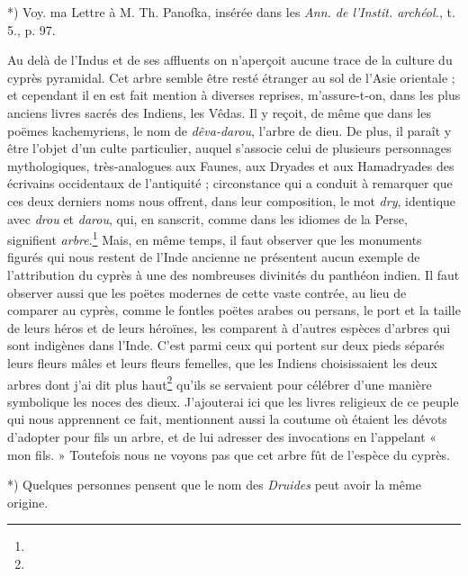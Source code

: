 \documentclass[a4paper, 11pt, oneside, polutonikogreek, french]{article}
\begin{document}
*) Voy. ma Lettre à M. Th. Panofka, insérée dans les \emph{Ann. de l'Instit. archéol.}, t. 5., p. 97.

Au delà de l'Indus et de ses affluents on n'aperçoit aucune trace de la culture du cyprès pyramidal. Cet arbre semble être resté étranger au sol de l'Asie orientale ; et cependant il en est fait mention à diverses reprises, m'assure-t-on, dans les plus anciens livres sacrés des Indiens, les Vêdas. Il y reçoit, de même que dans les poëmes kachemyriens, le nom de \emph{dêva-darou}, l'arbre de dieu. De plus, il paraît y être l'objet d'un culte particulier, auquel s'associe celui de plusieurs personnages mythologiques, très-analogues aux Faunes, aux Dryades et aux Hamadryades des écrivains occidentaux de l'antiquité ; circonstance qui a conduit à remarquer que ces deux derniers noms nous offrent, dans leur composition, le mot \emph{dry}, identique avec \emph{drou} et \emph{darou}, qui, en sanscrit, comme dans les idiomes de la Perse, signifient \emph{arbre}.\footnote{} Mais, en même temps, il faut observer que les monuments figurés qui nous restent de l'Inde ancienne ne présentent aucun exemple de l'attribution du cyprès à une des nombreuses divinités du panthéon indien. Il faut observer aussi que les poëtes modernes de cette vaste contrée, au lieu de comparer au cyprès, comme le fontles poëtes arabes ou persans, le port et la taille de leurs héros et de leurs héroïnes, les comparent à d'autres espèces d'arbres qui sont indigènes dans l'Inde. C'est parmi ceux qui portent sur deux pieds séparés leurs fleurs mâles et leurs fleurs femelles, que les Indiens choisissaient les deux arbres dont j'ai dit plus haut\footnote{} qu'ils se servaient pour célébrer d'une manière symbolique les noces des dieux. J'ajouterai ici que les livres religieux de ce peuple qui nous apprennent ce fait, mentionnent aussi la coutume où étaient les dévots d'adopter pour fils un arbre, et de lui adresser des invocations en l'appelant « mon fils. » Toutefois nous ne voyons pas que cet arbre fût de l'espèce du cyprès.

*) Quelques personnes pensent que le nom des \emph{Druides} peut avoir la même origine.
\end{document}
